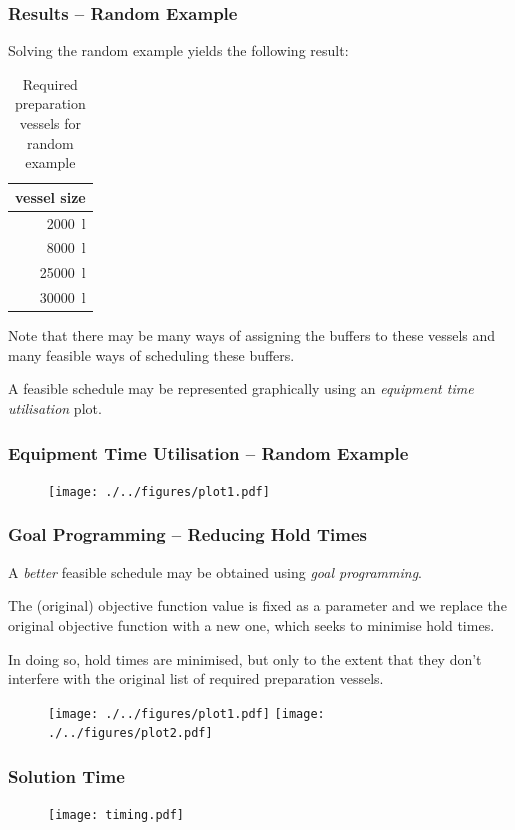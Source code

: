 \documentclass{beamer}
\begin{document}
\begin{frame}
    \frametitle{Results -- Random Example}
    Solving the random example yields the following result:
        \begin{table}
            \centering
            \caption{Required preparation vessels for random example}
            \begin{tabular}{r}
                vessel size\\ \hline
                \SI{2000}{\litre}\\
                \SI{8000}{\litre}\\
                \SI{25000}{\litre}\\
                \SI{30000}{\litre}\\
            \end{tabular}
        \end{table}
    Note that there may be many ways of assigning the buffers to these vessels
    and many feasible ways of scheduling these buffers.
    
    A feasible schedule may be represented graphically using an \emph{equipment
    time utilisation} plot.
\end{frame}

\begin{frame}
    \frametitle{Equipment Time Utilisation -- Random Example}
    \begin{figure}
        \centering
        \texttt{[image: ./../figures/plot1.pdf]}
    \end{figure}
\end{frame}

\begin{frame}
    \frametitle{Goal Programming -- Reducing Hold Times}
    A \emph{better} feasible schedule may be obtained using \emph{goal
    programming}.
    
    The (original) objective function value is fixed as a parameter and we
    replace the original objective function with a new one, which seeks to 
    minimise hold times.
    
    In doing so, hold times are minimised, but only to the extent that they
    don't interfere with the original list of required preparation vessels.
    \begin{figure}
        \centering
        \texttt{[image: ./../figures/plot1.pdf]}
        \texttt{[image: ./../figures/plot2.pdf]}
    \end{figure}
\end{frame}

\begin{frame}
    \frametitle{Solution Time}
    \begin{figure}
        \centering
        \texttt{[image: timing.pdf]}
    \end{figure}
\end{frame}
\end{document}

